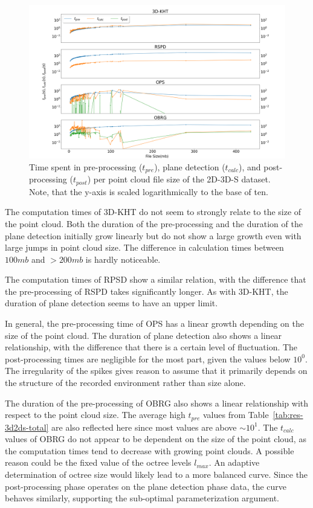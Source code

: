 \documentclass[main.tex]{subfiles}
\begin{document}
\begin{figure}[H]
    \centering
    \includegraphics[width=\textwidth]{images/SDsizetime.png}
    \caption[Time per Cloud size 2D-3D-S]{Time spent in pre-processing ($t_{pre}$), plane detection ($t_{calc}$),
        and post-processing ($t_{post}$) per point cloud file size of the 2D-3D-S dataset. Note, that the y-axis is
        scaled logarithmically to the base of ten.}
    \label{fig:sizetimestanford}
\end{figure}
The computation times of 3D-KHT do not seem to strongly relate to the size of the point cloud.
Both the duration of the pre-processing and the duration of the plane detection initially grow linearly
but do not show a large growth even with large jumps in point cloud size.
The difference in calculation times between $100mb$ and ${>}200mb$ is hardly noticeable.

The computation times of RPSD show a similar relation, with the difference that the pre-processing of RSPD takes significantly longer.
As with 3D-KHT, the duration of plane detection seems to have an upper limit.

In general, the pre-processing time of OPS has a linear growth depending on the size of the point cloud.
The duration of plane detection also shows a linear relationship, with the difference that there is a certain level
of fluctuation. The post-processing times are negligible for the most part, given the values below $10^0$.
The irregularity of the spikes gives reason to assume that it primarily depends on the structure of the recorded
environment rather than size alone.

The duration of the pre-processing of OBRG also shows a linear relationship with respect to the point cloud size.
The average high $t_{pre}$ values from Table~\ref{tab:res-3d2ds-total} are also reflected here since most values are above ${\sim}10^1$.
The $t_{calc}$ values of OBRG do not appear to be dependent on the size of the point cloud, as the computation
times tend to decrease with growing point clouds. A possible reason could be the fixed value of the octree levels $l_{max}$.
An adaptive determination of octree size would likely lead to a more balanced curve.
Since the post-processing phase operates on the plane detection phase data, the curve behaves similarly,
supporting the sub-optimal parameterization argument.
\end{document}
